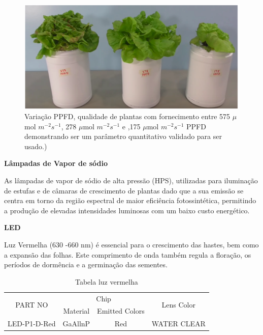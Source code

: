 \begin{figure}[H]
	\centering
	\includegraphics[width=15cm]{figuras/variacao_ppfd.png}
	\caption{Variação PPFD, qualidade de plantas com fornecimento entre 575 $\mu$mol $m^{-2}$$s^{-1}$, 278 $\mu$mol $m^{-2}$$s^{-1}$ e ,175 $\mu$mol $m^{-2}$$s^{-1}$ PPFD demonstrando ser um parâmetro quantitativo validado para ser usado.)} \label{variação_ppfd}
\end{figure}

\textbf{Lâmpadas de Vapor de sódio}

As lâmpadas de vapor de sódio de alta pressão (HPS), utilizadas para iluminação de estufas e de câmaras de crescimento de plantas dado que a sua emissão se centra em torno da região espectral de maior eficiência fotossintética, permitindo a produção de elevadas intensidades luminosas com um baixo custo energético.

\textbf{LED}

Luz Vermelha (630 -660 nm) é essencial para o crescimento das hastes, bem como a expansão das folhas. Este comprimento de onda também regula a floração, os períodos de dormência e a germinação das sementes. 

\begin{table}[H]
	\centering
	\begin{tabular}{|c|c|c|c|}
		\hline
		\multirow{2}{*}{PART NO}      & \multicolumn{2}{c|}{Chip} & \multirow{2}{*}{Lens Color} \\ \cline{2-3}
		&      Material     &     Emitted Colors	      &                   \\ \hline
		\multicolumn{1}{|l|}{LED-P1-D-Red} &   GaAllnP        &     Red      &      WATER CLEAR             \\ \hline
	\end{tabular}
	\caption{Tabela luz vermelha}
	\label{Tabela luz vermelha}
\end{table}



